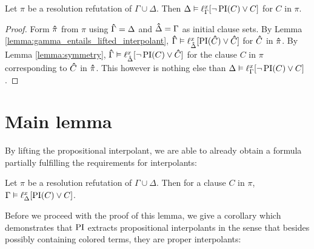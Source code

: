 \begin{corr}
	\label{cor:delta_entails_lifted_interpolant}
	Let $\pi$ be a resolution refutation of $\Gamma \cup \Delta$. 
	Then $\Delta \vDash \ell_{\Gamma}^{x}[ \lnot \operatorname{PI}(C) \lor C ]$ for $C$ in $\pi$.
\end{corr}
\begin{proof}
	Form $\bm\hat{\pi}$ from $\pi$ using $\bm\hat{\Gamma} = \Delta$ and $\bm\hat{\Delta} = \Gamma$ as initial clause sets.
	By Lemma \ref{lemma:gamma_entails_lifted_interpolant}, $\bm\hat{\Gamma} \vDash \ell_{\bm\hat{\Delta}}^{x}[ \operatorname{PI}(\bm\hat{C}) \lor \bm\hat{C} ]$ for $\bm\hat{C}$ in $\bm\hat{\pi}$. 
	By Lemma \ref{lemma:symmetry},
	$\bm\hat{\Gamma} \vDash \ell_{\bm\hat{\Delta}}^{x}[ \lnot \operatorname{PI}(C) \lor \bm\hat{C} ]$ for the clause $C$ in $\pi$ corresponding to $\bm\hat{C}$ in $\bm\hat{\pi}$. 
	This however is nothing else than 
	$\Delta \entails\nolinebreak \lft{\Gamma}{x}{ \lnot \PI(C) \lor C }$.
\end{proof}

\section{Main lemma}

By lifting the propositional interpolant, we are able to already obtain a formula partially fulfilling the requirements for interpolants:



\begin{lemma}
	Let $\pi$ be a resolution refutation of $\Gamma \cup \Delta$.
	Then for a clause $C$ in $\pi$,
	$ \Gamma \entails \lifdelta{\PI(C) \lor\nolinebreak C} $.
	\label{lemma:gamma_entails_lifted_interpolant}
\end{lemma}

Before we proceed with the proof of this lemma, we give a corollary which demonstrates that $\operatorname{PI}$ 
extracts propositional interpolants in the sense that besides possibly containing colored terms, they are proper interpolants:

